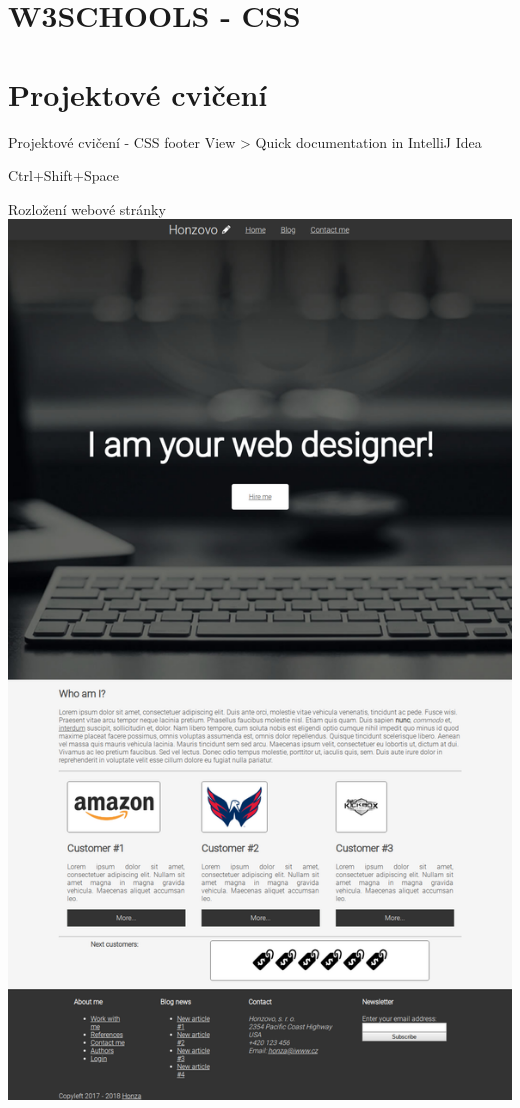 \documentclass{beamer}
\begin{document}
\section{W3SCHOOLS - CSS}

\section{Projektové cvičení}

\begin{frame}[fragile, shrink=0]{Projektové cvičení - CSS footer}
View > Quick documentation in IntelliJ Idea

Ctrl+Shift+Space
\end{frame}

\begin{frame}{Rozložení webové stránky}
  \includegraphics[scale=0.1]{project}
\end{frame}
\end{document}
